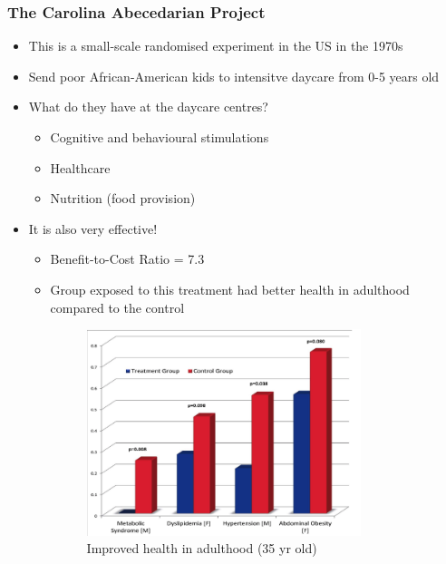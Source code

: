         \subsubsection{The Carolina Abecedarian Project}
            \begin{itemize}
                \item This is a small-scale randomised experiment in the US in the 1970s
                \item Send poor African-American kids to intensitve daycare from 0-5 years old
                \item What do they have at the daycare centres?
                \begin{itemize}
                    \item Cognitive and behavioural stimulations
                    \item Healthcare
                    \item Nutrition (food provision)
                \end{itemize}
            \item It is also very effective!
            \begin{itemize}
                \item Benefit-to-Cost Ratio = 7.3
                \item Group exposed to this treatment had better health in adulthood compared to the control
                    \begin{figure}[H]%
                \centering
                \includegraphics[width=8cm]{images/ch4/CAP_eval.png}
                \caption{Improved health in adulthood (35 yr old)}
                \label{CAP_eval}
                \end{figure}
            \end{itemize}
            \end{itemize}
            

